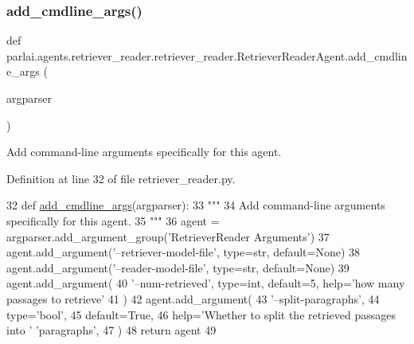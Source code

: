 \subsubsection{\texorpdfstring{add\+\_\+cmdline\+\_\+args()}{add\_cmdline\_args()}}
{\footnotesize\ttfamily def parlai.\+agents.\+retriever\+\_\+reader.\+retriever\+\_\+reader.\+Retriever\+Reader\+Agent.\+add\+\_\+cmdline\+\_\+args (\begin{DoxyParamCaption}\item[{}]{argparser }\end{DoxyParamCaption})\hspace{0.3cm}{\ttfamily [static]}}

\begin{DoxyVerb}Add command-line arguments specifically for this agent.
\end{DoxyVerb}
 

Definition at line 32 of file retriever\+\_\+reader.\+py.


\begin{DoxyCode}
32     \textcolor{keyword}{def }\hyperlink{namespaceparlai_1_1agents_1_1drqa_1_1config_a62fdd5554f1da6be0cba185271058320}{add\_cmdline\_args}(argparser):
33         \textcolor{stringliteral}{"""}
34 \textcolor{stringliteral}{        Add command-line arguments specifically for this agent.}
35 \textcolor{stringliteral}{        """}
36         agent = argparser.add\_argument\_group(\textcolor{stringliteral}{'RetrieverReader Arguments'})
37         agent.add\_argument(\textcolor{stringliteral}{'--retriever-model-file'}, type=str, default=\textcolor{keywordtype}{None})
38         agent.add\_argument(\textcolor{stringliteral}{'--reader-model-file'}, type=str, default=\textcolor{keywordtype}{None})
39         agent.add\_argument(
40             \textcolor{stringliteral}{'--num-retrieved'}, type=int, default=5, help=\textcolor{stringliteral}{'how many passages to retrieve'}
41         )
42         agent.add\_argument(
43             \textcolor{stringliteral}{'--split-paragraphs'},
44             type=\textcolor{stringliteral}{'bool'},
45             default=\textcolor{keyword}{True},
46             help=\textcolor{stringliteral}{'Whether to split the retrieved passages into '} \textcolor{stringliteral}{'paragraphs'},
47         )
48         \textcolor{keywordflow}{return} agent
49 
\end{DoxyCode}
\mbox{\label{classparlai_1_1agents_1_1retriever__reader_1_1retriever__reader_1_1RetrieverReaderAgent_a093b0a679a2cc8a09ed3a4ae314362b1}} 
